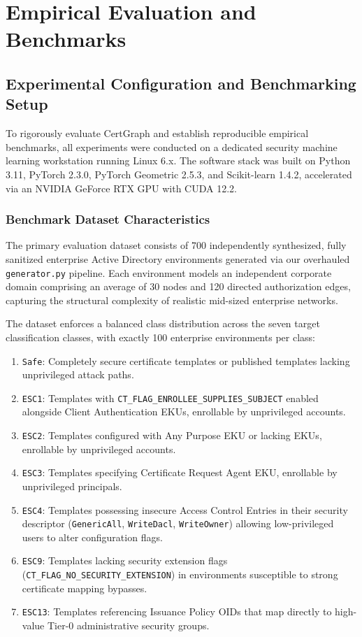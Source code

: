 \chapter{Empirical Evaluation and Benchmarks}
\label{ch:evaluation}

\section{Experimental Configuration and Benchmarking Setup}
To rigorously evaluate CertGraph and establish reproducible empirical benchmarks, all experiments were conducted on a dedicated security machine learning workstation running Linux 6.x. The software stack was built on Python 3.11, PyTorch 2.3.0, PyTorch Geometric 2.5.3, and Scikit-learn 1.4.2, accelerated via an NVIDIA GeForce RTX GPU with CUDA 12.2.

\subsection{Benchmark Dataset Characteristics}
The primary evaluation dataset consists of 700 independently synthesized, fully sanitized enterprise Active Directory environments generated via our overhauled \texttt{generator.py} pipeline. Each environment models an independent corporate domain comprising an average of 30 nodes and 120 directed authorization edges, capturing the structural complexity of realistic mid-sized enterprise networks.

The dataset enforces a balanced class distribution across the seven target classification classes, with exactly 100 enterprise environments per class:
\begin{enumerate}
    \item \texttt{Safe}: Completely secure certificate templates or published templates lacking unprivileged attack paths.
    \item \texttt{ESC1}: Templates with \texttt{CT\_FLAG\_ENROLLEE\_SUPPLIES\_SUBJECT} enabled alongside Client Authentication EKUs, enrollable by unprivileged accounts.
    \item \texttt{ESC2}: Templates configured with Any Purpose EKU or lacking EKUs, enrollable by unprivileged accounts.
    \item \texttt{ESC3}: Templates specifying Certificate Request Agent EKU, enrollable by unprivileged principals.
    \item \texttt{ESC4}: Templates possessing insecure Access Control Entries in their security descriptor (\texttt{GenericAll}, \texttt{WriteDacl}, \texttt{WriteOwner}) allowing low-privileged users to alter configuration flags.
    \item \texttt{ESC9}: Templates lacking security extension flags (\texttt{CT\_FLAG\_NO\_SECURITY\_EXTENSION}) in environments susceptible to strong certificate mapping bypasses.
    \item \texttt{ESC13}: Templates referencing Issuance Policy OIDs that map directly to high-value Tier-0 administrative security groups.
\end{enumerate}

